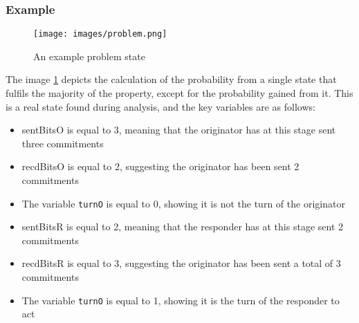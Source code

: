 \documentclass{l4proj}
\begin{document}

\subsubsection{Example}

\begin{figure}[ht!]
\centering
\texttt{[image: images/problem.png]}
\caption{An example problem state}
\label{problemState}
\end{figure}

The image \ref{problemState} depicts the calculation of the probability from a single state that fulfils the majority of the property, except for the probability gained from it. This is a real state found during analysis, and the key variables are as follows:
\begin{itemize}
\item sentBitsO is equal to 3, meaning that the originator has at this stage sent three commitments
\item recdBitsO is equal to 2, suggesting the originator has been sent 2 commitments
\item The variable {\tt turnO} is equal to 0, showing it is not the turn of the originator
\item sentBitsR is equal to 2, meaning that the responder has at this stage sent 2 commitments
\item recdBitsR is equal to 3, suggesting the originator has been sent a total of 3 commitments
\item The variable {\tt turnO} is equal to 1, showing it is the turn of the responder to act
\end{itemize}
\end{document}
